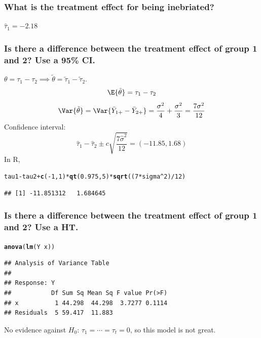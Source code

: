 \documentclass[oneside]{book}\usepackage[]{graphicx}\usepackage[dvipsnames,table,xcdraw]{xcolor}
\makeatletter
\newcommand{\hlnum}[1]{\textcolor[rgb]{0.686,0.059,0.569}{#1}}%
\newcommand{\hlopt}[1]{\textcolor[rgb]{0,0,0}{#1}}%
\newcommand{\hlstd}[1]{\textcolor[rgb]{0.345,0.345,0.345}{#1}}%
\newcommand{\hlkwd}[1]{\textcolor[rgb]{0.737,0.353,0.396}{\textbf{#1}}}%
\newenvironment{kframe}{%
 \def\at@end@of@kframe{}%
 \ifinner\ifhmode%
  \def\at@end@of@kframe{\end{minipage}}%
  \begin{minipage}{\columnwidth}%
 \fi\fi%
 \def\FrameCommand##1{\hskip\@totalleftmargin \hskip-\fboxsep
 \colorbox{shadecolor}{##1}\hskip-\fboxsep
     \hskip-\linewidth \hskip-\@totalleftmargin \hskip\columnwidth}%
 \MakeFramed {\advance\hsize-\width
   \@totalleftmargin\z@ \linewidth\hsize
   \@setminipage}}%
 {\par\unskip\endMakeFramed%
 \at@end@of@kframe}
\newenvironment{knitrout}{}{} %
\makeatother
\begin{document}
    \subsubsection*{What is the treatment effect for being inebriated?}
$ \hat{\tau}_1=-2.18 $
    \subsubsection*{Is there a difference between the treatment effect of group 1 and 2? Use a 95\% CI.}
$ \theta=\tau_1-\tau_2\implies \tilde{\theta}=\tilde{\tau}_1-\tilde{\tau}_2 $.
\[ \E{\tilde{\theta}}=\tau_1-\tau_2 \]
\[ \Var{\tilde{\theta}}=\Var{\bar{Y}_{1+}-\bar{Y}_{2+}}=\frac{\sigma^2}{4} +\frac{\sigma^2}{3}=\frac{7\sigma^2}{12}  \]
Confidence interval:
\[ \hat{\tau}_1-\hat{\tau}_2\pm c\sqrt{\frac{7\hat{\sigma}^2}{12}}=(-11.85,1.68) \]
In R,
\begin{knitrout}
\color{fgcolor}\begin{kframe}
\begin{alltt}
\hlstd{tau1} \hlopt{-} \hlstd{tau2} \hlopt{+} \hlkwd{c}\hlstd{(}\hlopt{-}\hlnum{1}\hlstd{,} \hlnum{1}\hlstd{)} \hlopt{*} \hlkwd{qt}\hlstd{(}\hlnum{0.975}\hlstd{,} \hlnum{5}\hlstd{)} \hlopt{*} \hlkwd{sqrt}\hlstd{((}\hlnum{7} \hlopt{*} \hlstd{sigma}\hlopt{^}\hlnum{2}\hlstd{)}\hlopt{/}\hlnum{12}\hlstd{)}
\end{alltt}
\begin{verbatim}
## [1] -11.851312   1.684645
\end{verbatim}
\end{kframe}
\end{knitrout}
\subsubsection*{Is there a difference between the treatment effect of group 1 and 2? Use a HT.}
\begin{knitrout}
\color{fgcolor}\begin{kframe}
\begin{alltt}
\hlkwd{anova}\hlstd{(}\hlkwd{lm}\hlstd{(Y} \hlopt{~} \hlstd{x))}
\end{alltt}
\begin{verbatim}
## Analysis of Variance Table
## 
## Response: Y
##           Df Sum Sq Mean Sq F value Pr(>F)
## x          1 44.298  44.298  3.7277 0.1114
## Residuals  5 59.417  11.883
\end{verbatim}
\end{kframe}
\end{knitrout}
No evidence against $ H_0 $: $ \tau_1=\cdots=\tau_t=0 $, so this model is not great.

\end{document}
